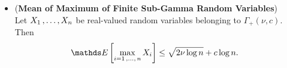 \documentclass[11pt]{article}
\begin{document}
\begin{itemize}
\item \begin{corollary} (\textbf{Mean of Maximum of Finite Sub-Gamma Random Variables})\\
Let $X_1 \,{,}\ldots{,}\, X_n$ be real-valued random variables belonging to $\Gamma_{+}(\nu, c)$. Then
\begin{align}
\E{}{\max\limits_{i=1 \xdotx{,} n} X_i} &\le \sqrt{2 \nu \log n} + c\log n. \label{ineqn: maximal_finite_subgamma}
\end{align}
\end{corollary}

\end{itemize}
\end{document}
